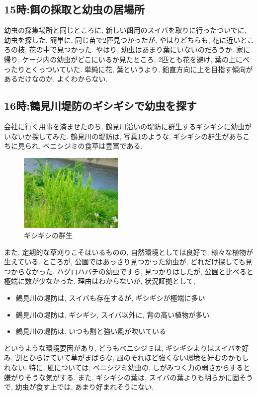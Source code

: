 \documentclass{jsarticle}
\begin{document}
\subsection{15時:餌の採取と幼虫の居場所}
幼虫の採集場所と同じところに, 新しい餌用のスイバを取りに行ったついでに, 
幼虫を探した. 簡単に, 同じ苗で2匹見つかったが, やはりどちらも, 花に近いところの枝, 花の中で見つかった. 
やはり, 幼虫はあまり葉にいないのだろうか. 
家に帰り, ケージ内の幼虫がどこにいるか見たところ, 2匹とも花を避け, 葉の上にべったりとくっついていた. 
単純に花, 葉というより, 鉛直方向に上を目指す傾向があるだけなのか. 
よくわからない. 

\subsection{16時:鶴見川堤防のギシギシで幼虫を探す}
会社に行く用事を済ませたのち, 鶴見川沿いの堤防に群生するギシギシに幼虫がいないか探してみた. 
鶴見川の堤防は, 写真\ref{pic-Tsurumi-River}のような, ギシギシの群生があちこちに見られ, ベニシジミの食草は豊富である. 
\begin{figure}[htbp]
  \begin{center}
    \includegraphics[width=5cm]{photo2/TsurumiRiver.JPG}
  \end{center}
  \caption{ギシギシの群生}
  \label{pic-Tsurumi-River}
\end{figure}
また, 定期的な草刈りこそはいるものの, 自然環境としては良好で, 様々な植物が生えている. 
ところが, 公園ではあっさり見つかった幼虫が, どれだけ探しても見つからなかった. 
ハグロハバチの幼虫ですら, 見つかりはしたが, 公園と比べると極端に数が少なかった. 
理由はわからないが, 状況証拠として, 
\begin{itemize}
  \item 鶴見川の堤防は, スイバも存在するが, ギシギシが極端に多い
  \item 鶴見川の堤防は, ギシギシ, スイバ以外に, 背の高い植物が多い
  \item 鶴見川の堤防は, いつも割と強い風が吹いている
\end{itemize}
というような環境要因があり, どうもベニシジミは, ギシギシよりはスイバを好み, 割とひらけていて草がまばらな, 風のそれほど強くない環境を好むのかもしれない. 
特に, 風については, ベニシジミ幼虫の, しがみつく力の弱さからすると嫌がりそうな気がする. 
また, ギシギシの葉は, スイバの葉よりも明らかに固そうで, 幼虫が食す上では, あまり好まれそうにない. 
\end{document}
